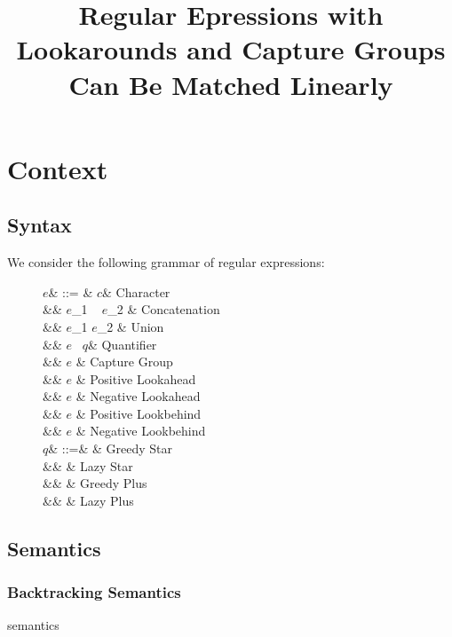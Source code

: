 \documentclass{article}
\title{Regular Epressions with Lookarounds and Capture Groups Can Be Matched Linearly}
\author{}
\date{}
\def\regex#1{\lstinline[style=rgx]{#1}}
\def\tregex#1{\text{\regex{#1}}}
\def\todo#1{{\color{ACMOrange}{TODO: }}#1}
\begin{document}
\maketitle


\section{Context}

\subsection{Syntax}
We consider the following grammar of regular expressions:

\def\re{\ensuremath{\mathit{e}}}
\def\char{\ensuremath{\mathit{c}}}
\def\quant{\ensuremath{\mathit{q}}}

\begin{figure}[h]
  \begin{syntax}
\re & ::= & \char & Character \\
&\mid& \re_1 ~ \re_2 & Concatenation\\
&\mid& \re_1 \tregex{|} \re_2 & Union\\
&\mid&  \re ~ \quant & Quantifier \\
&\mid&  \tregex{(}\re\tregex{)} & Capture Group \\
&\mid& \tregex{(?=}\re\tregex{)} & Positive Lookahead \\
&\mid& \tregex{(?!}\re\tregex{)} & Negative Lookahead \\
&\mid& \tregex{(?<=}\re\tregex{)} & Positive Lookbehind \\
&\mid& \tregex{(?<!}\re\tregex{)} & Negative Lookbehind \\
%
\quant & ::=& \tregex{*} & Greedy Star\\
&\mid& \tregex{*?} & Lazy Star\\
&\mid& \tregex{+} & Greedy Plus\\
&\mid& \tregex{+?} & Lazy Plus\\
  \end{syntax}
\end{figure}

\subsection{Semantics}
\subsubsection{Backtracking Semantics}
\todo{semantics}
\end{document}
